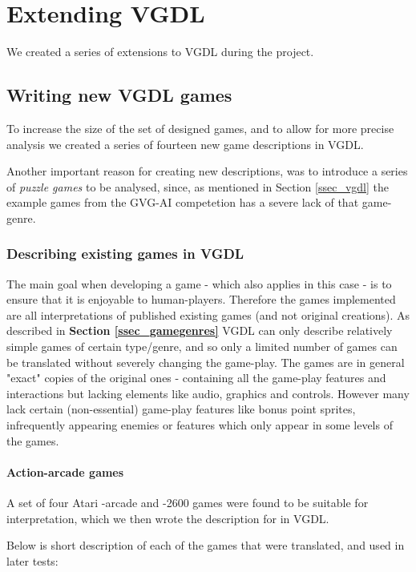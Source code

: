 \documentclass[a4paper,titlepage,final, twoside]{report}
\begin{document}
\chapter{Extending VGDL}

We created a series of extensions to VGDL during the project.



\section{Writing new VGDL games}

To increase the size of the set of designed games, and to allow for more precise analysis we created a series of fourteen new game descriptions in VGDL. 

Another important reason for creating new descriptions, was to introduce a series of \emph{puzzle games} to be analysed, since, as mentioned in Section \ref{ssec_vgdl} the example games from the GVG-AI competetion has a severe lack of that game-genre. 


\subsection{Describing existing games in VGDL}
The main goal when developing a game - which also applies in this case - is to ensure that it is enjoyable to human-players. 
Therefore the games implemented are all interpretations of published existing games (and not original creations).
As described in \textbf{Section \ref{ssec_gamegenres}} VGDL can only describe relatively simple games of certain type/genre, and so only a limited number of games can be translated without severely changing the game-play.
The games are in general "exact" copies of the original ones - containing all the game-play features and interactions but lacking elements like audio, graphics and controls. However many lack certain (non-essential) game-play features like bonus point sprites, infrequently appearing enemies or features which only appear in some levels of the games.

\subsubsection*{Action-arcade games}
A set of four Atari -arcade and -2600 games were found to be suitable for interpretation, which we then wrote the description for in VGDL. 

Below is short description of each of the games that were translated, and used in later tests:
\end{document}
